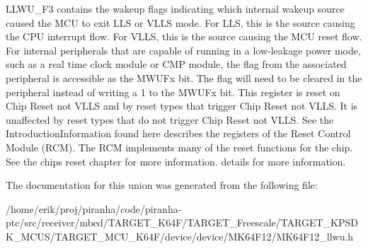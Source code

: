 L\+L\+W\+U\+\_\+\+F3 contains the wakeup flags indicating which internal wakeup source caused the M\+CU to exit L\+LS or V\+L\+LS mode. For L\+LS, this is the source causing the C\+PU interrupt flow. For V\+L\+LS, this is the source causing the M\+CU reset flow. For internal peripherals that are capable of running in a low-\/leakage power mode, such as a real time clock module or C\+MP module, the flag from the associated peripheral is accessible as the M\+W\+U\+Fx bit. The flag will need to be cleared in the peripheral instead of writing a 1 to the M\+W\+U\+Fx bit. This register is reset on Chip Reset not V\+L\+LS and by reset types that trigger Chip Reset not V\+L\+LS. It is unaffected by reset types that do not trigger Chip Reset not V\+L\+LS. See the Introduction\+Information found here describes the registers of the Reset Control Module (R\+CM). The R\+CM implements many of the reset functions for the chip. See the chip\textquotesingle{}s reset chapter for more information. details for more information. 

The documentation for this union was generated from the following file\+:\begin{DoxyCompactItemize}
\item 
/home/erik/proj/piranha/code/piranha-\/ptc/src/receiver/mbed/\+T\+A\+R\+G\+E\+T\+\_\+\+K64\+F/\+T\+A\+R\+G\+E\+T\+\_\+\+Freescale/\+T\+A\+R\+G\+E\+T\+\_\+\+K\+P\+S\+D\+K\+\_\+\+M\+C\+U\+S/\+T\+A\+R\+G\+E\+T\+\_\+\+M\+C\+U\+\_\+\+K64\+F/device/device/\+M\+K64\+F12/M\+K64\+F12\+\_\+llwu.\+h\end{DoxyCompactItemize}
